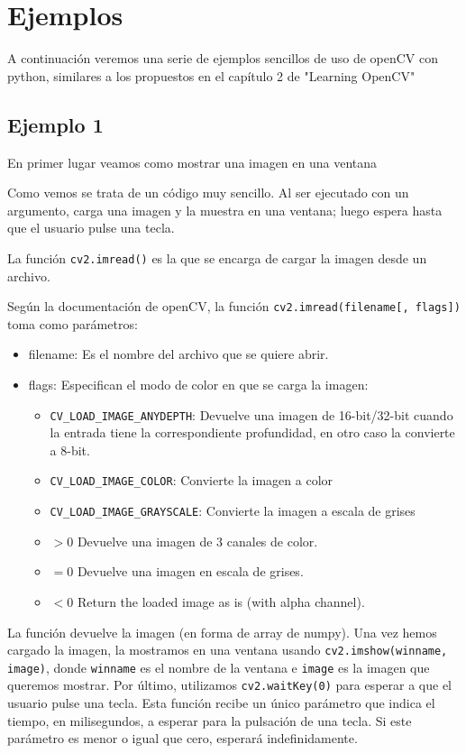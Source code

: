 \documentclass[a4paper,openright, 12pt]{book}
\begin{document}
\section{Ejemplos}
A continuación veremos una serie de ejemplos sencillos de uso de openCV con python, similares a los propuestos en el capítulo 2 de "Learning OpenCV" \cite{oreilly}
\subsection*{Ejemplo 1}
En primer lugar veamos como mostrar una imagen en una ventana

Como vemos se trata de un código muy sencillo. Al ser ejecutado con un argumento, carga una imagen y la muestra en una ventana; luego espera hasta que el usuario pulse una tecla.

La función \lstinline|cv2.imread()| es la que se encarga de cargar la imagen desde un archivo. 

Según la documentación de openCV, la función 
\lstinline|cv2.imread(filename[, flags])|
toma como parámetros:
\begin{itemize}

\item filename: Es el nombre del archivo que se quiere abrir.
\item flags:
Especifican el modo de color en que se carga la imagen:
\begin{itemize}
\item \lstinline|CV_LOAD_IMAGE_ANYDEPTH|: Devuelve una imagen de 16-bit/32-bit cuando la entrada tiene la correspondiente profundidad, en otro caso la convierte a 8-bit.
\item \lstinline|CV_LOAD_IMAGE_COLOR|: Convierte la imagen a color
\item \lstinline|CV_LOAD_IMAGE_GRAYSCALE|: Convierte la imagen a escala de grises
\item $>0$ Devuelve una imagen de 3 canales de color.

\item $=0$ Devuelve una imagen en escala de grises.
\item $<0$ Return the loaded image as is (with alpha channel).
\end{itemize}
\end{itemize}
La función devuelve la imagen (en forma de array de numpy).
\newline
Una vez hemos cargado la imagen, la mostramos en una ventana usando \lstinline|cv2.imshow(winname, image)|, donde \lstinline|winname| es el nombre de la ventana e \lstinline|image| es la imagen que queremos mostrar.
Por último, utilizamos \lstinline|cv2.waitKey(0)| para esperar a que el usuario pulse una tecla. Esta función recibe un único parámetro que indica el tiempo, en milisegundos, a esperar para la pulsación de una tecla. Si este parámetro es menor o igual que cero, esperará indefinidamente.
\end{document}
